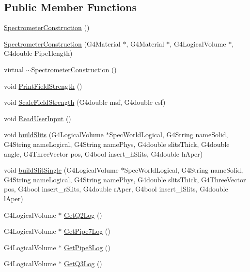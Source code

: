 \subsection*{Public Member Functions}
\begin{DoxyCompactItemize}
\item 
\hyperlink{classSpectrometerConstruction_a550c55f38d0f8d4344fb6be563d6ca7f}{Spectrometer\+Construction} ()
\item 
\hyperlink{classSpectrometerConstruction_a6b26b8f616d7c08d5d1d63cb7568216f}{Spectrometer\+Construction} (G4\+Material $\ast$, G4\+Material $\ast$, G4\+Logical\+Volume $\ast$, G4double Pipe1length)
\item 
virtual \hyperlink{classSpectrometerConstruction_a8a2ddf38fbfe14272890210f84fefead}{$\sim$\+Spectrometer\+Construction} ()
\item 
void \hyperlink{classSpectrometerConstruction_ad26f83a8a7106f39ad6caed5e012bcec}{Print\+Field\+Strength} ()
\item 
void \hyperlink{classSpectrometerConstruction_a8ab3d828bb6d80cac29f4fa8b6a77808}{Scale\+Field\+Strength} (G4double msf, G4double esf)
\item 
void \hyperlink{classSpectrometerConstruction_a34b3ae954aafe7734b3d5451a2339886}{Read\+User\+Input} ()
\item 
void \hyperlink{classSpectrometerConstruction_a6fff28e5fd2286884c4d1c3eaf6b1fa5}{build\+Slits} (G4\+Logical\+Volume $\ast$Spec\+World\+Logical, G4\+String name\+Solid, G4\+String name\+Logical, G4\+String name\+Phys, G4double slits\+Thick, G4double angle, G4\+Three\+Vector pos, G4bool insert\+\_\+h\+Slits, G4double h\+Aper)
\item 
void \hyperlink{classSpectrometerConstruction_ada8cbb45dddb279db8aa86322c3f2d76}{build\+Slit\+Single} (G4\+Logical\+Volume $\ast$Spec\+World\+Logical, G4\+String name\+Solid, G4\+String name\+Logical, G4\+String name\+Phys, G4double slits\+Thick, G4\+Three\+Vector pos, G4bool insert\+\_\+r\+Slits, G4double r\+Aper, G4bool insert\+\_\+l\+Slits, G4double l\+Aper)
\item 
G4\+Logical\+Volume $\ast$ \hyperlink{classSpectrometerConstruction_ae72330343c76b6226e32f6b22e6d3808}{Get\+Q2\+Log} ()
\item 
G4\+Logical\+Volume $\ast$ \hyperlink{classSpectrometerConstruction_a5faa9072e9668f52b02f84939253a8c3}{Get\+Pipe7\+Log} ()
\item 
G4\+Logical\+Volume $\ast$ \hyperlink{classSpectrometerConstruction_a12a39b746bcae5a3430b9cb9263182a2}{Get\+Pipe8\+Log} ()
\item 
G4\+Logical\+Volume $\ast$ \hyperlink{classSpectrometerConstruction_a1bb912fd72f100e04e0d85084cfd32e5}{Get\+Q3\+Log} ()
\end{DoxyCompactItemize}


